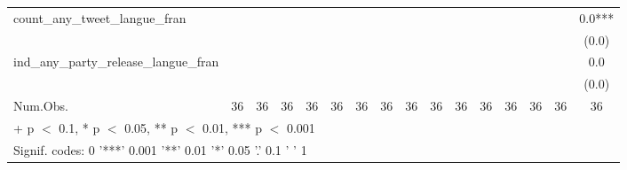 \begin{table}
\begin{tabular}[t]{lccccccccccccccc}
count\_any\_tweet\_langue\_fran &  &  &  &  &  &  &  &  &  &  &  &  &  &  & \num{0.0}***\\
 &  &  &  &  &  &  &  &  &  &  &  &  &  &  & \vphantom{1} (\num{0.0})\\
ind\_any\_party\_release\_langue\_fran &  &  &  &  &  &  &  &  &  &  &  &  &  &  & \num{0.0}\\
 &  &  &  &  &  &  &  &  &  &  &  &  &  &  & (\num{0.0})\\
\midrule
Num.Obs. & \num{36} & \num{36} & \num{36} & \num{36} & \num{36} & \num{36} & \num{36} & \num{36} & \num{36} & \num{36} & \num{36} & \num{36} & \num{36} & \num{36} & \num{36}\\
\bottomrule
\multicolumn{16}{l}{\rule{0pt}{1em}+ p $<$ 0.1, * p $<$ 0.05, ** p $<$ 0.01, *** p $<$ 0.001}\\
\multicolumn{16}{l}{\rule{0pt}{1em}Signif. codes: 0 '***' 0.001 '**' 0.01 '*' 0.05 '.' 0.1 ' ' 1}\\
\end{tabular}
\end{table}
